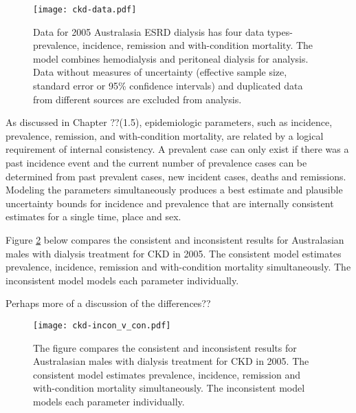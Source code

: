     \begin{figure}[h]
        \begin{center}
            \texttt{[image: ckd-data.pdf]}
            \caption{Data for 2005 Australasia ESRD dialysis has four data types-prevalence, incidence, remission and with-condition mortality.  The model combines hemodialysis and peritoneal dialysis for analysis.  Data without measures of uncertainty (effective sample size, standard error or 95\% confidence intervals) and duplicated data from different sources are excluded from analysis.}
            \label{fig:app-CKD data}
        \end{center}
    \end{figure}

As discussed in Chapter ??(1.5), epidemiologic parameters, such as incidence, prevalence, remission, and with-condition mortality, are related by a logical requirement of internal consistency.  A prevalent case can only exist if there was a past incidence event and the current number of prevalence cases can be determined from past prevalent cases, new incident cases, deaths and remissions.  Modeling the parameters simultaneously produces a best estimate and plausible uncertainty bounds for incidence and prevalence that are internally consistent estimates for a single time, place and sex.

Figure \ref{fig:app-CKD incon v con} below compares the consistent and inconsistent results for Australasian males with dialysis treatment for CKD in 2005.  The consistent model estimates prevalence, incidence, remission and with-condition mortality simultaneously.  The inconsistent model models each parameter individually.

Perhaps more of a discussion of the differences??

    \begin{figure}[h]
        \begin{center}
            \texttt{[image: ckd-incon\_v\_con.pdf]}
            \caption{The figure compares the consistent and inconsistent results for Australasian males with dialysis treatment for CKD in 2005.  The consistent model estimates prevalence, incidence, remission and with-condition mortality simultaneously.  The inconsistent model models each parameter individually.}
            \label{fig:app-CKD incon v con}
        \end{center}
    \end{figure}